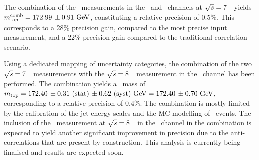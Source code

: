 The combination of the \mt\ measurements in the \ttbarll\ and \ttbarlj\ channels at ${\sqrt{s}}=7$~\TeV\ yields $m_{\mathrm{top}}^{\mathrm{comb}} = 172.99\,\pm 0.91~\mathrm{GeV}$, constituting a relative precision of $0.5\%$. This corresponds to a 28\% precision gain, compared to the most precise input measurement, and a 22\% precision gain compared to the traditional correlation scenario.




Using a dedicated mapping of uncertainty categories, the combination of the two ${\sqrt{s}}=7$~\TeV\ measurements with the ${\sqrt{s}}=8$~\TeV\ measurement in the \dil\ channel has been performed. The combination yields a \tquark\ mass of $m_{\mathrm{top}} = 172.40\,\pm 0.31~\mathrm{(stat)}\,\pm 0.62~\mathrm{(syst)}~\mathrm{GeV} = 172.40\,\pm 0.70~\mathrm{GeV}$, corresponding to a relative precision of $0.4\%$.
%
The combination is mostly limited by the calibration of the jet energy scales and the MC modelling of \ttbar\ events. 
%
The inclusion of the \mt\ measurement at ${\sqrt{s}}=8$~\TeV\ in the \ljets\ channel in the combination is expected to yield another significant improvement in precision due to the anti-correlations that are present by construction. This analysis is currently being finalised and results are expected soon.
%



